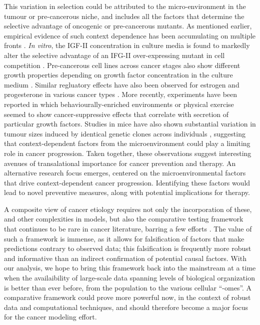 \documentclass[10pt,twocolumn,twoside]{article}
\begin{document}
This variation in selection could be attributed to the micro-environment in the tumour or pre-cancerous niche, and includes all the factors that determine the selective advantage of oncogenic or pre-cancerous mutants. As mentioned earlier, empirical evidence of such context dependence has been accumulating on multiple fronts \cite{Hansen2000,Pietras2010,Hanahan2012,Cabarcas2011a}. \textit{In vitro}, the IGF-II concentration in culture media is found to markedly alter the selective advantage of an IFG-II over-expressing mutant in cell competition \cite{Archetti2015}. Pre-cancerous cell lines across cancer stages also show different growth properties depending on growth factor concentration in the culture medium \cite{Chan2014}. Similar regluatory effects have also been observed for estrogen and progesterone in various cancer types \cite{Haslam2001,Woodward2000,DICKSON1987,Garcia1992}. More recently, experiments have been reported in which behaviourally-enriched environments or physical exercise seemed to show cancer-suppressive effects \cite{Cao2010,Rundqvist2013} that correlate with secretion of particular growth factors. Studies in mice have also shown substantial variation in tumour sizes induced by identical genetic clones across individuals \cite{Rogers2017}, suggesting that context-dependent factors from the microenvironment could play a limiting role in cancer progression. Taken together, these observations suggest interesting avenues of transalational importance for cancer prevention and therapy. An alternative research focus emerges, centered on the microenvironmental factors that drive context-dependent cancer progression. Identifying these factors would lead to novel preventive measures, along with potential implications for therapy.

A composite view of cancer etiology requires not only the incorporation of these, and other complexities in models, but also the comparative testing framework that continues to be rare in cancer literature, barring a few efforts \cite{Frank2007}. The value of such a framework is immense, as it allows for falsification of factors that make predictions contrary to observed data; this falsification is frequently more robust and informative than an indirect confirmation of potential causal factors. With our analysis, we hope to bring this framework back into the mainstream at a time when the availaibility of large-scale data spanning levels of biological organization is better than ever before, from the population to the various cellular ``-omes''. A comparative framework could prove more powerful now, in the context of robust data and computational techniques, and should therefore become a major focus for the cancer modeling effort.
\end{document}
